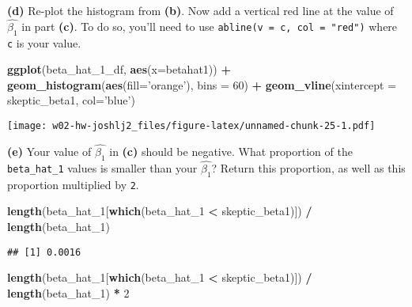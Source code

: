 \documentclass[]{article}
\newenvironment{Shaded}{\begin{snugshade}}{\end{snugshade}}
\newcommand{\KeywordTok}[1]{\textcolor[rgb]{0.13,0.29,0.53}{\textbf{#1}}}
\newcommand{\DataTypeTok}[1]{\textcolor[rgb]{0.13,0.29,0.53}{#1}}
\newcommand{\DecValTok}[1]{\textcolor[rgb]{0.00,0.00,0.81}{#1}}
\newcommand{\StringTok}[1]{\textcolor[rgb]{0.31,0.60,0.02}{#1}}
\newcommand{\OperatorTok}[1]{\textcolor[rgb]{0.81,0.36,0.00}{\textbf{#1}}}
\newcommand{\NormalTok}[1]{#1}
\begin{document}
\textbf{(d)} Re-plot the histogram from \textbf{(b)}. Now add a vertical
red line at the value of \(\hat{\beta_1}\) in part \textbf{(c)}. To do
so, you'll need to use \texttt{abline(v\ =\ c,\ col\ =\ "red")} where
\texttt{c} is your value.

\begin{Shaded}
\begin{Highlighting}[]
\KeywordTok{ggplot}\NormalTok{(beta_hat_1_df, }\KeywordTok{aes}\NormalTok{(}\DataTypeTok{x=}\NormalTok{betahat1)) }\OperatorTok{+}\StringTok{ }\KeywordTok{geom_histogram}\NormalTok{(}\KeywordTok{aes}\NormalTok{(}\DataTypeTok{fill=}\StringTok{'orange'}\NormalTok{), }\DataTypeTok{bins =} \DecValTok{60}\NormalTok{) }\OperatorTok{+}\StringTok{ }\KeywordTok{geom_vline}\NormalTok{(}\DataTypeTok{xintercept =}\NormalTok{ skeptic_beta1, }\DataTypeTok{col=}\StringTok{'blue'}\NormalTok{)}
\end{Highlighting}
\end{Shaded}

\texttt{[image: w02-hw-joshlj2\_files/figure-latex/unnamed-chunk-25-1.pdf]}

\textbf{(e)} Your value of \(\hat{\beta_1}\) in \textbf{(c)} should be
negative. What proportion of the \texttt{beta\_hat\_1} values is smaller
than your \(\hat{\beta_1}\)? Return this proportion, as well as this
proportion multiplied by \texttt{2}.

\begin{Shaded}
\begin{Highlighting}[]
\KeywordTok{length}\NormalTok{(beta_hat_}\DecValTok{1}\NormalTok{[}\KeywordTok{which}\NormalTok{(beta_hat_}\DecValTok{1} \OperatorTok{<}\StringTok{ }\NormalTok{skeptic_beta1)]) }\OperatorTok{/}\StringTok{ }\KeywordTok{length}\NormalTok{(beta_hat_}\DecValTok{1}\NormalTok{)}
\end{Highlighting}
\end{Shaded}

\begin{verbatim}
## [1] 0.0016
\end{verbatim}

\begin{Shaded}
\begin{Highlighting}[]
\KeywordTok{length}\NormalTok{(beta_hat_}\DecValTok{1}\NormalTok{[}\KeywordTok{which}\NormalTok{(beta_hat_}\DecValTok{1} \OperatorTok{<}\StringTok{ }\NormalTok{skeptic_beta1)]) }\OperatorTok{/}\StringTok{ }\KeywordTok{length}\NormalTok{(beta_hat_}\DecValTok{1}\NormalTok{) }\OperatorTok{*}\StringTok{ }\DecValTok{2}
\end{Highlighting}
\end{Shaded}
\end{document}
